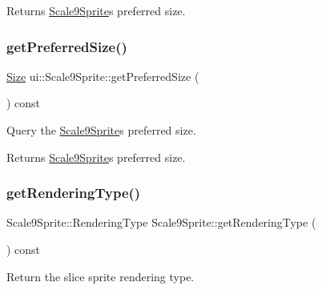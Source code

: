 \begin{DoxyReturn}{Returns}
\hyperlink{classui_1_1Scale9Sprite}{Scale9\+Sprite}\textquotesingle{}s preferred size. 
\end{DoxyReturn}
\mbox{\label{classui_1_1Scale9Sprite_aeb8648160608228729e97d474d132088}} 
\subsubsection{\texorpdfstring{get\+Preferred\+Size()}{getPreferredSize()}\hspace{0.1cm}{\footnotesize\ttfamily [2/2]}}
{\footnotesize\ttfamily \hyperlink{classSize}{Size} ui\+::\+Scale9\+Sprite\+::get\+Preferred\+Size (\begin{DoxyParamCaption}{ }\end{DoxyParamCaption}) const}



Query the \hyperlink{classui_1_1Scale9Sprite}{Scale9\+Sprite}\textquotesingle{}s preferred size. 

\begin{DoxyReturn}{Returns}
\hyperlink{classui_1_1Scale9Sprite}{Scale9\+Sprite}\textquotesingle{}s preferred size. 
\end{DoxyReturn}
\mbox{\label{classui_1_1Scale9Sprite_a19fd59e100f7b6636291f23088c19292}} 
\subsubsection{\texorpdfstring{get\+Rendering\+Type()}{getRenderingType()}\hspace{0.1cm}{\footnotesize\ttfamily [1/2]}}
{\footnotesize\ttfamily Scale9\+Sprite\+::\+Rendering\+Type Scale9\+Sprite\+::get\+Rendering\+Type (\begin{DoxyParamCaption}{ }\end{DoxyParamCaption}) const}

Return the slice sprite rendering type. \mbox{\label{classui_1_1Scale9Sprite_a460bd16954e1a62f14bd0bf7aab490c8}} 
